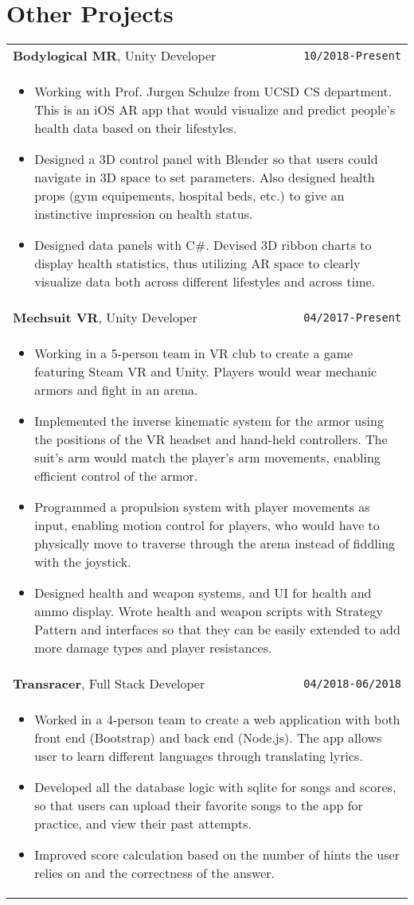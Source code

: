 \documentclass[10pt, letterpaper]{article}
\newcommand{\itemcols}[1]{
	\multicolumn{2}{p{\dimexpr \linewidth-2\tabcolsep}}{
	\begin{itemize}
		#1
	\end{itemize}
	}
}
\begin{document}
\section{Other Projects}
\smallskip
\noindent
\begin{tabularx}{\linewidth}{X r}
	\textbf{\large Bodylogical MR}, Unity Developer & \texttt{10/2018-Present} \\
	\itemcols{		
		\item Working with Prof. Jurgen Schulze from UCSD CS department. This is an iOS AR app that would visualize and predict people's health data based on their lifestyles. 
		\item Designed a 3D control panel with Blender so that users could navigate in 3D space to set parameters. Also designed health props (gym equipements, hospital beds, etc.) to give an instinctive impression on health status.
		\item Designed data panels with C\#. Devised 3D ribbon charts to display health statistics, thus utilizing AR space to clearly visualize data both across different lifestyles and across time.
	} \\
	
	\textbf{\large Mechsuit VR}, Unity Developer & \texttt{04/2017-Present} \\
	\itemcols{
		\item Working in a 5-person team in VR club to create a game featuring Steam VR and Unity. Players would wear mechanic armors and fight in an arena.
		\item Implemented the inverse kinematic system for the armor using the positions of the VR headset and hand-held controllers. The suit's arm would match the player's arm movements, enabling efficient control of the armor.
		\item Programmed a propulsion system with player movements as input, enabling motion control for players, who would have to physically move to traverse through the arena instead of fiddling with the joystick. 
		\item Designed health and weapon systems, and UI for health and ammo display. Wrote health and weapon scripts with Strategy Pattern and interfaces so that they can be easily extended to add more damage types and player resistances.
	} \\
	
	\textbf{\large Transracer}, Full Stack Developer & \texttt{04/2018-06/2018} \\
	\itemcols{
		\item Worked in a 4-person team to create a web application with both front end (Bootstrap) and back end (Node.js). The app allows user to learn different languages through translating lyrics.
		\item Developed all the database logic with sqlite for songs and scores, so that users can upload their favorite songs to the app for practice, and view their past attempts.
		\item Improved score calculation based on the number of hints the user relies on and the correctness of the answer.
	} \\
	

\end{tabularx}
\end{document}

